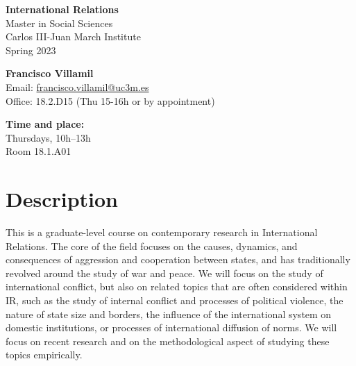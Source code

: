 \documentclass[12pt, a4paper]{article}
\begin{document}
\begin{center}
{\LARGE\bf International Relations}\\\vspace{10pt}
Master in Social Sciences\\Carlos III-Juan March Institute\\
\vspace{10pt}
{\large Spring 2023}\\
\end{center}

\vspace{15pt}

\begin{minipage}{0.6\textwidth}
\textbf{Francisco Villamil}\\
Email: \href{francisco.villamil@uc3m.es}{francisco.villamil@uc3m.es}\\
Office: 18.2.D15 (Thu 15-16h or by appointment)
\end{minipage}\hfill
\begin{minipage}{0.39\textwidth}
\centering
\textbf{Time and place:}\\
Thursdays, 10h--13h\\Room 18.1.A01
\end{minipage}


\section{Description}

This is a graduate-level course on contemporary research in International Relations. The core of the field focuses on the causes, dynamics, and consequences of aggression and cooperation between states, and has traditionally revolved around the study of war and peace.
We will focus on the study of international conflict, but also on related topics that are often considered within IR, such as the study of internal conflict and processes of political violence, the nature of state size and borders, the influence of the international system on domestic institutions, or processes of international diffusion of norms.
We will focus on recent research and on the methodological aspect of studying these topics empirically.
\end{document}
